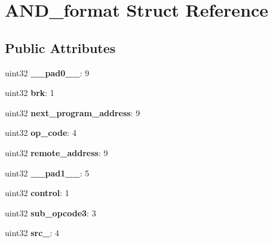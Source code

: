 \hypertarget{structAND__format}{}\section{A\+N\+D\+\_\+format Struct Reference}
\label{structAND__format}
\subsection*{Public Attributes}
\begin{DoxyCompactItemize}
\item 
\mbox{\label{structAND__format_ab171de18f315d8559e23da997c0268d6}} 
uint32 {\bfseries \+\_\+\+\_\+pad0\+\_\+\+\_\+}\+: 9
\item 
\mbox{\label{structAND__format_afc5fce199e5c907fa490d12f94e30bb8}} 
uint32 {\bfseries brk}\+: 1
\item 
\mbox{\label{structAND__format_a634437c93c694835240eda3a81635857}} 
uint32 {\bfseries next\+\_\+program\+\_\+address}\+: 9
\item 
\mbox{\label{structAND__format_a22f0d1e7e28151b34e0a49a8e70a02a8}} 
uint32 {\bfseries op\+\_\+code}\+: 4
\item 
\mbox{\label{structAND__format_a1e7a3fa44da02a76df83295bf44e87ab}} 
uint32 {\bfseries remote\+\_\+address}\+: 9
\item 
\mbox{\label{structAND__format_a6736918b8f781e6ddeea1672ce69734c}} 
uint32 {\bfseries \+\_\+\+\_\+pad1\+\_\+\+\_\+}\+: 5
\item 
\mbox{\label{structAND__format_a0867d6c5b069d0d8de54e9c7fa2747ac}} 
uint32 {\bfseries control}\+: 1
\item 
\mbox{\label{structAND__format_a22b76ff6c6158a9e6553ca99077b68fa}} 
uint32 {\bfseries sub\+\_\+opcode3}\+: 3
\item 
\mbox{\label{structAND__format_a219c52fa7d6e17e82561161129953e42}} 
uint32 {\bfseries src\+\_}\+: 4
\item 

\end{DoxyCompactItemize}
